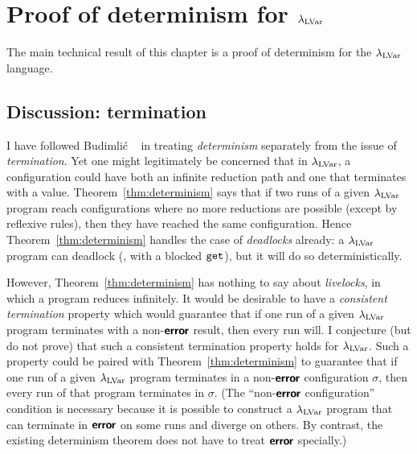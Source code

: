 \section{Proof of determinism for $\lambda_{\textrm{LVar}}$}\label{s:lvars-proof}

The main technical result of this chapter is a proof of determinism
for the $\lambda_{\textrm{LVar}}$ language.  


\subsection{Discussion: termination}

I have followed Budimli\'c \etal~\cite{CnC} in treating
\emph{determinism} separately from the issue of \emph{termination}.
Yet one might legitimately be concerned that in $\lambda_{\textrm{LVar}}$, a
configuration could have both an infinite reduction path and one that
terminates with a value.  Theorem~\ref{thm:determinism} says that if
two runs of a given $\lambda_{\textrm{LVar}}$ program reach configurations where
no more reductions are possible (except by reflexive rules), then they
have reached the same configuration.  Hence
Theorem~\ref{thm:determinism} handles the case of \emph{deadlocks}
already: a $\lambda_{\textrm{LVar}}$ program can deadlock (\eg, with a blocked
$\mbox{\texttt{get}}$), but it will do so deterministically.

However, Theorem~\ref{thm:determinism} has nothing to say about
\emph{livelocks}, in which a program reduces infinitely.  It would be
desirable to have a {\em consistent termination} property which would
guarantee that if one run of a given $\lambda_{\textrm{LVar}}$ program terminates
with a non-$\textbf{\textsf{error}}$ result, then every run will.  I conjecture (but do
not prove) that such a consistent termination property holds for
$\lambda_{\textrm{LVar}}$.  Such a property could be paired with
Theorem~\ref{thm:determinism} to guarantee that if one run of a given
$\lambda_{\textrm{LVar}}$ program terminates in a non-$\textbf{\textsf{error}}$ configuration
$\sigma$, then every run of that program terminates in $\sigma$.  (The
``non-$\textbf{\textsf{error}}$ configuration'' condition is necessary because it is
possible to construct a $\lambda_{\textrm{LVar}}$ program that can terminate in
$\textbf{\textsf{error}}$ on some runs and diverge on others.  By contrast, the
existing determinism theorem does not have to treat $\textbf{\textsf{error}}$
specially.)
